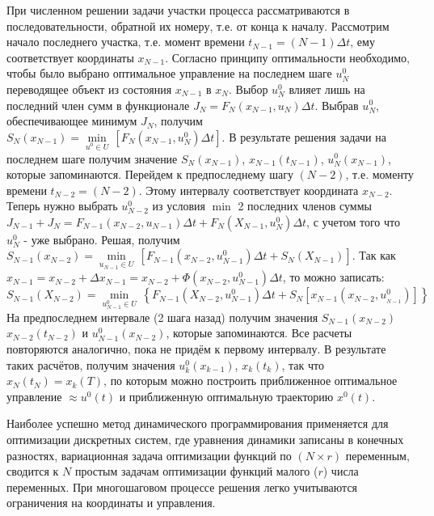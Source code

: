 \documentclass[preprint,russian,a5paper,10pt,twoside,mediummath]{ncc}
\begin{document}
\par При численном решении задачи участки процесса рассматриваются в последовательности, обратной их номеру, т.е. от конца к началу. Рассмотрим начало последнего участка, т.е. момент времени ${{t}_{N-1}}=\left( N-1 \right)\Delta t$, ему соответствует координаты ${{x}_{N-1}}$. Согласно принципу оптимальности необходимо, чтобы было выбрано оптимальное управление на последнем шаге $u_{N}^{0}$ переводящее объект из состояния ${{x}_{N-1}}$ в ${{x}_{N}}$. Выбор $u_{N}^{0}$ влияет лишь на последний член сумм в функционале ${{J}_{N}}={{F}_{N}}\left( {{x}_{N-1}},{{u}_{N}} \right)\Delta t$. Выбрав $u_{N}^{0}$, обеспечивающее минимум ${{J}_{N}}$, получим ${{S}_{N}}\left( {{x}_{N-1}} \right)=\underset{{{u}^{0}}\in U}{\mathop{\min }}\,\left[ {{F}_{N}}\left( {{x}_{N-1}},u_{N}^{0} \right)\Delta t \right]$. В результате решения задачи на последнем шаге получим значение ${{S}_{N}}\left( {{x}_{N-1}} \right)$, ${{x}_{N-1}}\left( {{t}_{N-1}} \right)$, $u_{N}^{0}\left( {{x}_{N-1}} \right)$, которые запоминаются. Перейдем к предпоследнему шагу $\left( N-2 \right)$, т.е. моменту времени ${{t}_{N-2}}=\left( N-2 \right)$. Этому интервалу соответствует координата ${{x}_{N-2}}$. Теперь нужно выбрать $u_{N-2}^{0}$ из условия $\min $ 2 последних членов суммы
\\${{J}_{N-1}}+{{J}_{N}}={{F}_{N-1}}\left( {{x}_{N-2}},{{u}_{N-1}} \right)\Delta t+{{F}_{N}}\left( {{X}_{N-1}},u_{N}^{0} \right)\Delta t$, с учетом того что $u_{N}^{0}$ - уже выбрано. Решая, получим 
${{S}_{N-1}}\left( {{x}_{N-2}} \right)=\underset{{{u}_{N-1}}\in U}{\mathop{\min }}\,\left[ {{F}_{N-1}}\left( {{x}_{N-2}},u_{N-1}^{0} \right)\Delta t+{{S}_{N}}\left( {{X}_{N-1}} \right) \right]$. Так как ${{x}_{N-1}}={{x}_{N-2}}+\Delta {{x}_{N-1}}={{x}_{N-2}}+\Phi \left( {{x}_{N-2}},u_{N-1}^{0} \right)\Delta t$, то можно записать: 
\\${{S}_{N-1}}\left( {{X}_{N-2}} \right)=\underset{u_{N-1}^{0}\in U}{\mathop{\min }}\,\left\{ {{F}_{N-1}}\left( {{X}_{N-2}},u_{N-1}^{0} \right)\Delta t+{{S}_{N}}\left[ {{x}_{N-1}}\left( {{x}_{N-2}},u_{_{N-1}}^{0} \right) \right] \right\}$ 
\\На предпоследнем интервале (2 шага назад) получим значения ${{S}_{N-1}}\left( {{x}_{N-2}} \right)$ ${{x}_{N-2}}\left( {{t}_{N-2}} \right)$ и $u_{N-1}^{0}\left( {{x}_{N-2}} \right)$, которые запоминаются. Все расчеты повторяются аналогично, пока не придём к первому интервалу. В результате таких расчётов, получим значения $u_{k}^{0}\left( {{x}_{k-1}} \right)$, ${{x}_{k}}\left( {{t}_{k}} \right)$, так что ${{x}_{N}}\left( {{t}_{N}} \right)={{x}_{k}}\left( T \right)$, по которым можно построить приближенное оптимальное управление $\approx {{u}^{0}}\left( t \right)$ и приближенную оптимальную траекторию ${{x}^{0}}\left( t \right)$.
\par Наиболее успешно метод динамического программирования применяется для оптимизации дискретных систем, где уравнения динамики записаны в конечных разностях, вариационная задача оптимизации функций по $\left( N\times r \right)$ переменным, сводится к $N$ простым задачам оптимизации функций малого ($r$) числа переменных. При многошаговом процессе решения легко учитываются ограничения на координаты и управления. 
\end{document}
